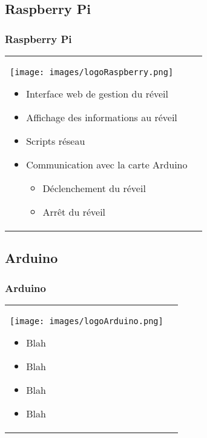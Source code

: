 \documentclass[handout]{beamer}
\begin{document}
	\subsection{Raspberry Pi}
		\begin{frame}
		\frametitle{Raspberry Pi}

		\begin{tabular}{l l}
			\begin{minipage}{0.2\textwidth}
				\begin{center}
					\texttt{[image: images/logoRaspberry.png]}
				\end{center}
			\end{minipage}

			\begin{minipage}{0.8\textwidth}
				\begin{itemize}
					\item Interface web de gestion du réveil
					\item Affichage des informations au réveil
					\item Scripts réseau
					\item Communication avec la carte Arduino
					\begin{itemize}
						\item Déclenchement du réveil 
						\item Arrêt du réveil 
					\end{itemize}
				\end{itemize}
			\end{minipage}
			
		\end{tabular}
		\end{frame}

	\subsection{Arduino}
		\begin{frame}
		\frametitle{Arduino}

		\begin{tabular}{l l}
			\begin{minipage}{0.2\textwidth}
				\begin{center}
					\texttt{[image: images/logoArduino.png]}
				\end{center}
			\end{minipage}

			\begin{minipage}{0.8\textwidth}
				\begin{itemize}
					\item Blah
					\item Blah
					\item Blah
					\item Blah
				\end{itemize}
			\end{minipage}
			
		\end{tabular}
		\end{frame}
\end{document}
